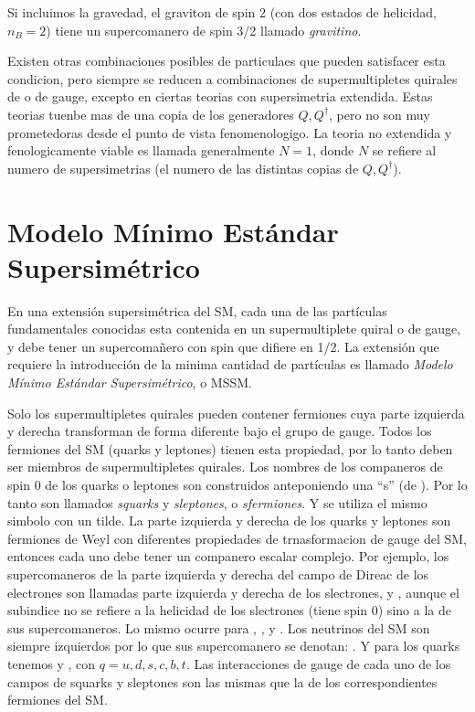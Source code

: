 Si incluimos la gravedad, el graviton de spin 2 (con dos estados de helicidad, $n_B=2$)
tiene un supercomanero de spin 3/2 llamado \emph{gravitino}.

Existen otras combinaciones posibles de particulaes que pueden satisfacer esta
condicion, pero siempre se reducen a combinaciones de supermultipletes quirales
de o de gauge, excepto en ciertas teorias con supersimetria extendida. Estas
teorias tuenbe mas de una copia de los generadores $Q, Q^\dagger$, pero no son
muy prometedoras desde el punto de vista fenomenologigo.
La teoria no extendida y fenologicamente viable es llamada generalmente $N=1$,
donde $N$ se refiere al numero de supersimetrias (el numero de las distintas
copias de $Q,Q^\dagger$).


\section{Modelo Mínimo Estándar Supersimétrico}

En una extensión supersimétrica del SM, cada una de las partículas fundamentales
conocidas esta contenida en un supermultiplete quiral o de gauge, y debe tener
un supercoma\~nero con spin que difiere en 1/2.
La extensión que requiere la introducci\'on de la minima cantidad de
partículas es llamado \emph{Modelo Mínimo Estándar Supersimétrico}, o MSSM.


Solo los supermultipletes quirales pueden contener fermiones cuya parte izquierda
y derecha transforman de forma diferente bajo el grupo de gauge.
Todos los fermiones del SM (quarks y leptones) tienen esta propiedad,
por lo tanto deben ser miembros de supermultipletes quirales.
Los nombres de los companeros de spin 0 de los quarks o leptones son construidos
anteponiendo una ``s'' (de ). Por lo tanto son llamados \emph{squarks}
y \emph{sleptones}, o \emph{sfermiones}. Y se utiliza el mismo simbolo con un tilde.
La parte izquierda y derecha de los quarks y leptones son fermiones de Weyl
con diferentes propiedades de trnasformacion de gauge del SM, entonces cada
uno debe tener un companero escalar complejo.
Por ejemplo, los supercomaneros de la parte izquierda y derecha del campo
de Direac de los electrones son llamadas parte izquierda y derecha de los
slectrones, {\selL} y {\selR}, aunque el subindice no se refiere a la
helicidad de los slectrones (tiene spin 0) sino a la de sus supercomaneros.
Lo mismo ocurre para {\smuL}, {\smuR}, {\stauL} y {\stauR}. Los neutrinos
del SM son siempre izquierdos por lo que sus supercomanero se denotan:
{\snu}. Y para los quarks tenemos {\squarkL} y {\squarkR}, con $q = u, d, s, c, b, t$.
Las interacciones de gauge de cada uno de los campos de squarks y sleptones
son las mismas que la de los correspondientes fermiones del SM.

